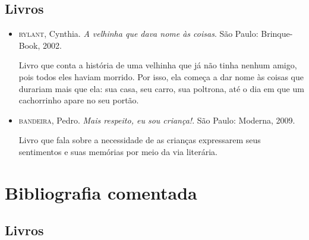 \documentclass[11pt]{extarticle}
\begin{document}
\subsection{Livros} 

\begin{itemize}
\item \textsc{rylant}, Cynthia. \textit{A velhinha que dava nome às coisas}. São Paulo: Brinque-Book, 2002.

Livro que conta a história de uma velhinha que já não tinha nenhum amigo, pois todos eles haviam morrido. Por isso, ela começa a dar nome às coisas que durariam mais que ela: sua casa, seu carro, sua poltrona, até o dia em que um cachorrinho apare no seu portão.

\item \textsc{bandeira}, Pedro. \textit{Mais respeito, eu sou criança!}. São Paulo: Moderna, 2009.

Livro que fala sobre a necessidade de as crianças expressarem seus sentimentos e suas memórias por meio da via literária.

\end{itemize}

\section{Bibliografia comentada}
\subsection{Livros}
\end{document}

